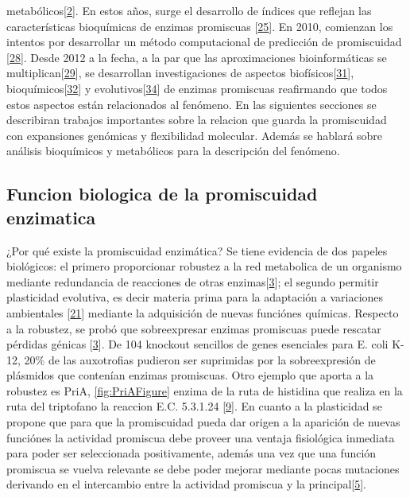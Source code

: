 \documentclass[12pt,twoside]{reedthesis}
\begin{document}
  metabólicos{[}\protect\hyperlink{ref-nam_network_2012}{2}{]}. En estos
  años, surge el desarrollo de índices que reflejan las características
  bioquímicas de enzimas promiscuas
  {[}\protect\hyperlink{ref-nath_quantifying_2010}{25}{]}. En 2010,
  comienzan los intentos por desarrollar un método computacional de
  predicción de promiscuidad
  {[}\protect\hyperlink{ref-carbonell_molecular_2010}{28}{]}. Desde 2012 a
  la fecha, a la par que las aproximaciones bioinformáticas se
  multiplican{[}\protect\hyperlink{ref-nagao_prediction_2014}{29}{]}, se
  desarrollan investigaciones de aspectos
  biofísicos{[}\protect\hyperlink{ref-noda-garcia_evolution_2013}{31}{]},
  bioquímicos{[}\protect\hyperlink{ref-verdel-aranda_molecular_2015}{32}{]}
  y evolutivos{[}\protect\hyperlink{ref-copley_evolutionary_2015}{34}{]}
  de enzimas promiscuas reafirmando que todos estos aspectos están
  relacionados al fenómeno. En las siguientes secciones se describiran
  trabajos importantes sobre la relacion que guarda la promiscuidad con
  expansiones genómicas y flexibilidad molecular. Además se hablará sobre
  análisis bioquímicos y metabólicos para la descripción del fenómeno.
  
  \subsection{Funcion biologica de la promiscuidad
  enzimatica}\label{funcion-biologica-de-la-promiscuidad-enzimatica}
  
  ¿Por qué existe la promiscuidad enzimática? Se tiene evidencia de dos
  papeles biológicos: el primero proporcionar robustez a la red metabolica
  de un organismo mediante redundancia de reacciones de otras
  enzimas{[}\protect\hyperlink{ref-patrick_multicopy_2007}{3}{]}; el
  segundo permitir plasticidad evolutiva, es decir materia prima para la
  adaptación a variaciones ambientales
  {[}\protect\hyperlink{ref-aharoni_evolvability_2005}{21}{]} mediante la
  adquisición de nuevas funciónes químicas. Respecto a la robustez, se
  probó que sobreexpresar enzimas promiscuas puede rescatar pérdidas
  génicas {[}\protect\hyperlink{ref-patrick_multicopy_2007}{3}{]}. De 104
  knockout sencillos de genes esenciales para E. coli K-12, 20\% de las
  auxotrofias pudieron ser suprimidas por la sobreexpresión de plásmidos
  que contenían enzimas promiscuas. Otro ejemplo que aporta a la robustez
  es PriA, \autoref{fig:PriAFigure} enzima de la ruta de histidina que
  realiza en la ruta del triptofano la reaccion E.C. 5.3.1.24
  {[}\protect\hyperlink{ref-baronagomez_occurrence_2003}{9}{]}. En cuanto
  a la plasticidad se propone que para que la promiscuidad pueda dar
  origen a la aparición de nuevas funciónes la actividad promiscua debe
  proveer una ventaja fisiológica inmediata para poder ser seleccionada
  positivamente, además una vez que una función promiscua se vuelva
  relevante se debe poder mejorar mediante pocas mutaciones derivando en
  el intercambio entre la actividad promiscua y la
  principal{[}\protect\hyperlink{ref-khersonsky_enzyme_2010}{5}{]}.
  
\end{document}
